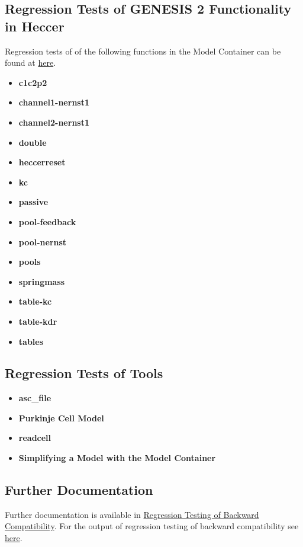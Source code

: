 \documentclass[12pt]{article}
\begin{document}
\subsection*{Regression Tests of GENESIS 2 Functionality in Heccer}

Regression tests of of the following functions in the Model Container can be found at \href{http://www.neurospaces.org/neurospaces_project/ns-sli/tests/html/specifications/heccer/main.html}{here}.

   \begin{itemize}
     \item[]{\bf c1c2p2}
     \item[]{\bf channel1-nernst1}
     \item[]{\bf channel2-nernst1	}
     \item[]{\bf double}
     \item[]{\bf heccerreset}
     \item[]{\bf kc}
     \item[]{\bf passive}
     \item[]{\bf pool-feedback}
     \item[]{\bf pool-nernst}
     \item[]{\bf pools}
     \item[]{\bf springmass}
     \item[]{\bf table-kc}
     \item[]{\bf table-kdr}
     \item[]{\bf tables}
   \end{itemize}
   
\subsection*{Regression Tests of Tools}
   \begin{itemize}
     \item[]{\bf asc\_file}
     \item[]{\bf Purkinje Cell Model}
     \item[]{\bf readcell}
     \item[]{\bf Simplifying a Model with the Model Container}
   \end{itemize}
   
\subsection*{Further Documentation}

Further documentation is available in \href{../tests-backward compatibility/tests-backward compatibility.tex}{Regression Testing of Backward Compatibility}. For the output of regression testing of backward compatibility see \href{http://www.neurospaces.org/neurospaces_project/ns-sli/tests/html/index.html}{here}.
\end{document}
